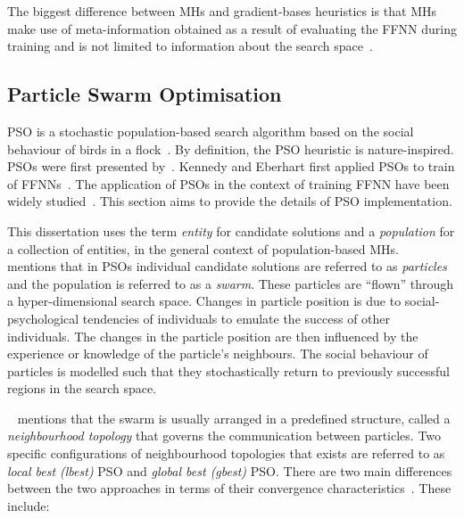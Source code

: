 The biggest difference between \acp{MH} and gradient-bases heuristics is that
\acp{MH} make use of meta-information obtained as a result of evaluating the \acs{FFNN} during training and is not limited to information about the search space~\cite{ref:blum:2003}.


\subsection{Particle Swarm Optimisation}\label{sec:heuristics:mh:pso}

\Acf{PSO} is a stochastic population-based search algorithm based on the social behaviour of birds in a flock~\cite{ref:kennedy:1995}. By definition, the \acs{PSO} heuristic is nature-inspired.  \Acp{PSO} were first presented  by~\citeauthor{ref:kennedy:1995}\cite{ref:kennedy:1995}. Kennedy and Eberhart first applied \acp{PSO} to train of \acp{FFNN}~\cite{ref:eberhart:1995, ref:kennedy:1997}. The application of \acp{PSO} in the context of training \acs{FFNN} have been widely studied~\cite{ref:rakitianskaia:2012, ref:vanwyk:2014}. This section aims to provide the details of \acs{PSO} implementation.

This dissertation uses the term \textit{entity} for candidate solutions and a \textit{population} for a collection of entities, in the general context of population-based \acp{MH}.~\citeauthor{ref:engelbrecht:2007}~\cite{ref:engelbrecht:2007} mentions that in \acp{PSO} individual candidate solutions are referred to as \textit{particles} and the population is referred to as a \textit{swarm}. These particles are ``flown'' through a hyper-dimensional search space. Changes in particle position is due to social-psychological tendencies of individuals to emulate the success of other individuals. The changes in the particle position are then influenced by the experience or knowledge of the particle's neighbours. The social behaviour of particles is modelled such that they stochastically return to previously successful regions in the search space.

\citeauthor{ref:vanwyk:2014}~\cite{ref:vanwyk:2014} mentions that the swarm is usually arranged in a predefined structure, called a \textit{neighbourhood topology} that governs the communication between particles. Two specific configurations of neighbourhood topologies that exists are referred to as \textit{local best (lbest)} \acs{PSO} and \textit{global best (gbest)} \acs{PSO}. There are two main differences between the two approaches in terms of their convergence characteristics~\cite{ref:eberhart:1996}. These include:

